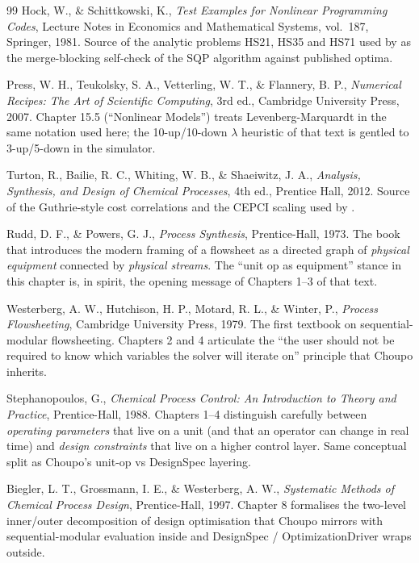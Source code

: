 \documentclass[11pt,a4paper]{article}
\begin{document}
\begin{thebibliography}{99}
 Hock, W., \& Schittkowski, K., \emph{Test
Examples for Nonlinear Programming Codes}, Lecture Notes in Economics and
Mathematical Systems, vol.~187, Springer, 1981. Source of the analytic
problems HS21, HS35 and HS71 used by  as the
merge-blocking self-check of the SQP algorithm against published optima.

 Press, W. H., Teukolsky, S. A.,
Vetterling, W. T., \& Flannery, B. P., \emph{Numerical Recipes:
The Art of Scientific Computing}, 3rd ed., Cambridge University Press,
2007. Chapter 15.5 (``Nonlinear Models'') treats Levenberg-Marquardt in
the same notation used here; the 10-up/10-down $\lambda$ heuristic of
that text is gentled to 3-up/5-down in the simulator.

 Turton, R., Bailie, R. C., Whiting, W. B., \& Shaeiwitz,
J. A., \emph{Analysis, Synthesis, and Design of Chemical Processes},
4th ed., Prentice Hall, 2012. Source of the Guthrie-style cost
correlations and the CEPCI scaling used by .

 Rudd, D. F., \& Powers, G. J.,
\emph{Process Synthesis}, Prentice-Hall, 1973.  The book that
introduces the modern framing of a flowsheet as a directed graph of
\emph{physical equipment} connected by \emph{physical streams}.  The
``unit op as equipment'' stance in this chapter is, in spirit, the
opening message of Chapters 1--3 of that text.

 Westerberg, A. W., Hutchison, H. P.,
Motard, R. L., \& Winter, P., \emph{Process Flowsheeting},
Cambridge University Press, 1979.  The first textbook on
sequential-modular flowsheeting.  Chapters 2 and 4 articulate the
``the user should not be required to know which variables the solver
will iterate on'' principle that Choupo inherits.

 Stephanopoulos, G., \emph{Chemical
Process Control: An Introduction to Theory and Practice},
Prentice-Hall, 1988.  Chapters 1--4 distinguish carefully between
\emph{operating parameters} that live on a unit (and that an
operator can change in real time) and \emph{design constraints}
that live on a higher control layer.  Same conceptual split as
Choupo's unit-op vs DesignSpec layering.

 Biegler, L. T., Grossmann,
I. E., \& Westerberg, A. W., \emph{Systematic Methods of Chemical
Process Design}, Prentice-Hall, 1997.  Chapter 8 formalises the
two-level inner/outer decomposition of design optimisation that
Choupo mirrors with sequential-modular evaluation inside and
DesignSpec / OptimizationDriver wraps outside.


\end{thebibliography}
\end{document}

